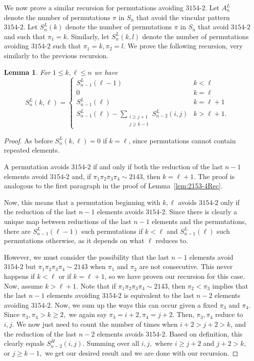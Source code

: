 \documentclass[11pt]{amsart}
\newtheorem{lemma}[theorem]{Lemma}
\theoremstyle{definition}
\begin{document}
We now prove a similar recursion for permutations avoiding $3154{\text{-}}2.$ 
Let $A_n^{L}$ denote the number of permutations $\pi$ in $S_n$ that avoid the vincular pattern $3154{\text{-}}2.$ 
Let $S_n^{L}(k)$ denote the number of permutations $\pi$ in $S_n$ that avoid $3154{\text{-}}2$ and such that $\pi_1 = k.$ 
Similarly, let $S_n^{L}(k, l)$ denote the number of permutations avoiding $3154{\text{-}}2$ such that $\pi_1 = k, \pi_2 = l.$  We prove the following recursion, very similarly to the previous recursion.

\begin{lemma}
	\label{lem:3154-2Rec}
	For $1 \le k, \ell \le n$ we have
    \[
		S_n^L(k, \ell) = 
		\begin{cases} 
		  S_{n-1}^L(\ell-1) & k < \ell \\
		  0 & k = \ell \\
		  S_{n-1}^L(\ell) & k = \ell+1 \\
		  S_{n-1}^L(\ell)
		  - \displaystyle\sum_{\substack{i \ge j+1 \\ j \ge k-1}} S_{n-2}^L(i, j) & k > \ell+1.
	   \end{cases}
   \]
\end{lemma}

\begin{proof}
	As before $S_n^L(k, \ell) = 0$ if $k = \ell$, since
	permutations cannot contain repeated elements.

	A permutation avoids $3154{\text{-}}2$ if and only if both the reduction of the last $n-1$ elements avoid $3154{\text{-}}2$ and, if $\pi_1\pi_2\pi_3\pi_4 \sim 2143$, then $k = \ell+1$.  The proof is analogous to the first paragraph in the proof of Lemma~\ref{lem:2153-4Rec}.
    
    Now, this means that a permutation beginning with $k, \ell$ avoids $3154{\text{-}}2$ only if the reduction of the last $n-1$ elements avoids $3154{\text{-}}2.$  Since there is clearly a unique map between reductions of the last $n-1$ elements and the permutations, there are $S_{n-1}^L(\ell-1)$ such permutations if $k<\ell$ and $S_{n-1}^L(\ell)$ such permutations otherwise, as it depends on what $\ell$ reduces to.
    
    However, we must consider the possibility that the last $n-1$ elements avoid $3154{\text{-}}2$ but $\pi_1\pi_2\pi_3\pi_4 \sim 2143$ when $\pi_1$ and $\pi_2$ are not consecutive.  This never happens if $k < \ell$ or if $k = \ell+1$, so we have proven our recursion for this case.  Now, assume $k > \ell+1.$  Note that if $\pi_1\pi_2\pi_3\pi_4 \sim 2143$, then $\pi_2 < \pi_3$ implies that the last $n-1$ elements avoiding $3154{\text{-}}2$ is equivalent to the last $n-2$ elements avoiding $3154{\text{-}}2.$ Now, we sum up the ways this can occur given a fixed $\pi_3$ and $\pi_4.$  Since $\pi_3, \pi_4 > k \ge 2,$ we again say $\pi_3 = i+2, \pi_4 = j+2.$  Then, $\pi_3, \pi_4$ reduce to $i, j$.  We now just need to count the number of times when $i+2 > j+2 > k$, and the reduction of the last $n-2$ elements avoids $3154{\text{-}}2.$  Based on definition, this clearly equals $S_{n-2}^H(i, j).$  Summing over all $i, j,$ where $i \ge j+2$ and $j+2 > k,$ or $j \ge k-1,$ we get our desired result and we are done with our recursion.
\end{proof}
\end{document}
